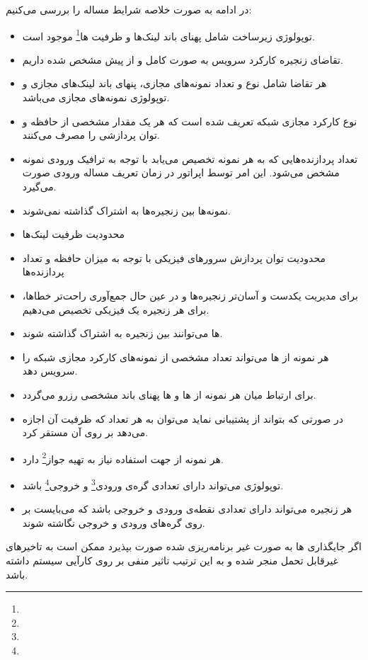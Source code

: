 در ادامه به صورت خلاصه شرایط مساله را بررسی می‌کنیم:

\begin{itemize}
    \item توپولوژی زیرساخت شامل پهنای باند لینک‌ها و ظرفیت ها\footnote{} موجود است.
    \item {} تقاضای زنجیره‌ کارکرد سرویس به صورت کامل و از پیش مشخص شده داریم.
    \item هر تقاضا شامل نوع و تعداد نمونه‌های مجازی، پنهای باند لینک‌های مجازی و توپولوژی نمونه‌های مجازی می‌باشد.
    \item {} نوع کارکرد مجازی شبکه تعریف شده است که هر یک مقدار مشخصی از حافظه و توان پردازشی را مصرف می‌کنند.
    \item تعداد پردازنده‌هایی که به هر نمونه تخصیص می‌یابد با توجه به ترافیک ورودی نمونه مشخص می‌شود. این امر توسط اپراتور در زمان تعریف مساله ورودی صورت می‌گیرد.
    \item نمونه‌ها بین زنجیره‌ها به اشتراک گذاشته نمی‌شوند.
    \item محدودیت ظرفیت لینک‌ها
    \item محدودیت توان پردازش سرورهای فیزیکی با توجه به میزان حافظه و تعداد پردازنده‌ها
    \item برای مدیریت یکدست و آسان‌تر زنجیره‌ها و در عین حال جمع‌آوری راحت‌تر خطاها، برای هر زنجیره یک  فیزیکی تخصیص می‌دهیم.
    \item {}ها می‌توانند بین زنجیره به اشتراک گذاشته شوند.
    \item هر نمونه از ها می‌تواند تعداد مشخصی از نمونه‌های کارکرد مجازی شبکه را سرویس دهد. 
    \item برای ارتباط میان هر نمونه از ها و ها پهنای باند مشخصی رزرو می‌گردد.
    \item در صورتی که  بتواند از  پشتیبانی نماید می‌توان به هر تعداد که ظرفیت آن اجازه می‌دهد بر روی آن  مستقر کرد.
    \item هر نمونه از  جهت استفاده نیاز به تهیه جواز\footnote{} دارد.
    \item توپولوژی می‌تواند دارای تعدادی گره‌ی ورودی\footnote{} و خروجی\footnote{} باشد.
    \item هر زنجیره می‌تواند دارای تعدادی نقطه‌ی ورودی و خروجی باشد که می‌بایست بر روی گره‌های ورودی و خروجی نگاشته شوند.
\end{itemize}

اگر جایگذاری ها به صورت غیر برنامه‌ریزی شده صورت بپذیرد
ممکن است به تاخیرهای غیرقابل تحمل منجر شده و به این ترتیب تاثیر منفی بر روی کارآیی سیستم
داشته باشد.

